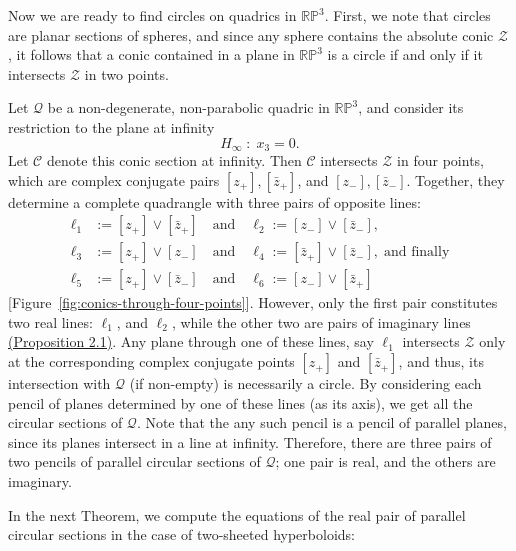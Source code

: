 \documentclass[10pt, a4paper]{article}
\theoremstyle{BoldTopSpacing}
\theoremstyle{BoldTopSpacing}
\theoremstyle{BoldTopSpacing}
\theoremstyle{BoldTopBottomSpacing}
\theoremstyle{BoldTopSpacing}
\theoremstyle{BoldTopBottomSpacing}
\theoremstyle{remark}
\begin{document}
Now we are ready to find circles on quadrics in $\mathbb{R}\mathbb{P}^3$. First, we note that circles are planar sections of spheres, and since any sphere contains the absolute conic $\mathcal{Z}$, it follows that a conic contained in a plane in $\mathbb{R}\mathbb{P}^3$ is a circle if and only if it intersects $\mathcal{Z}$ in two points. \par
Let $\mathcal{Q}$ be a non-degenerate, non-parabolic quadric in $\mathbb{R}\mathbb{P}^3$, and consider its restriction to the plane at infinity
\[
    H_{\infty} \; : \; x_{3} = 0.
\]
Let $\mathcal{C}$ denote this conic section at infinity. Then $\mathcal{C}$ intersects $\mathcal{Z}$ in four points, which are complex conjugate pairs $[z_{+}], [\bar{z}_{+}]$, and $[z_{-}], [\bar{z}_{-}]$. Together, they determine a complete quadrangle with three pairs of opposite lines:
\begin{align*}
    \ell_{1} &:= [z_{+}] \vee [\bar{z}_{+}] \quad \text{and} \quad \ell_{2} := [z_{-}] \vee [\bar{z}_{-}], \\
    \ell_{3} &:= [z_{+}] \vee [z_{-}] \quad \text{and} \quad \ell_{4} := [\bar{z}_{+}] \vee [\bar{z}_{-}], \; \text{and finally} \\
    \ell_{5} &:= [z_{+}] \vee [\bar{z}_{-}] \quad \text{and} \quad \ell_{6} :=  [z_{-}] \vee [\bar{z}_{+}]
\end{align*}
[Figure~\ref{fig:conics-through-four-points}]. However, only the first pair constitutes two real lines: $\ell_{1}$, and $\ell_{2}$, while the other two are pairs of imaginary lines \hyperref[thm:span-real-line]{(Proposition 2.1)}. Any plane through one of these lines, say $\ell_{1}$ intersects $\mathcal{Z}$ only at the corresponding complex conjugate points $[z_{+}]$ and $[\bar{z}_{+}]$, and thus, its intersection with $\mathcal{Q}$ (if non-empty) is necessarily a circle. By considering each pencil of planes determined by one of these lines (as its axis), we get all the circular sections of $\mathcal{Q}$. Note that the any such pencil is a pencil of parallel planes, since its planes intersect in a line at infinity. Therefore, there are three pairs of two pencils of parallel circular sections of $\mathcal{Q}$; one pair is real, and the others are imaginary. \par

In the next Theorem, we compute the equations of the real pair of parallel circular sections in the case of two-sheeted hyperboloids:
\end{document}
